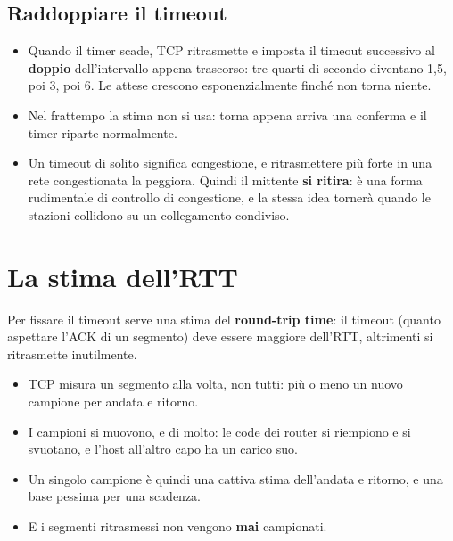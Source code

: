 \subsection{Raddoppiare il timeout}

\begin{itemize}
    \item Quando il timer scade, TCP ritrasmette e imposta il timeout successivo al \textbf{doppio} dell'intervallo appena
          trascorso: tre quarti di secondo diventano 1,5, poi 3, poi 6. Le attese crescono esponenzialmente finché non torna
          niente.
    \item Nel frattempo la stima non si usa: torna appena arriva una conferma e il timer riparte normalmente.
    \item Un timeout di solito significa congestione, e ritrasmettere più forte in una rete congestionata la peggiora.
          Quindi il mittente \textbf{si ritira}: è una forma rudimentale di controllo di congestione, e la stessa idea
          tornerà quando le stazioni collidono su un collegamento condiviso.
\end{itemize}

\section{La stima dell'RTT}

Per fissare il timeout serve una stima del \textbf{round-trip time}: il timeout (quanto aspettare l'ACK di un
segmento) deve essere maggiore dell'RTT, altrimenti si ritrasmette inutilmente.


\begin{itemize}
    \item TCP misura un segmento alla volta, non tutti: più o meno un nuovo campione per andata e ritorno.
    \item I campioni si muovono, e di molto: le code dei router si riempiono e si svuotano, e l'host all'altro capo ha un
          carico suo.
    \item Un singolo campione è quindi una cattiva stima dell'andata e ritorno, e una base pessima per una scadenza.
    \item E i segmenti ritrasmessi non vengono \textbf{mai} campionati.
\end{itemize}

